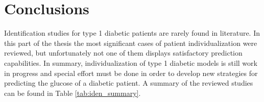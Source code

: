 
\chapter*{Conclusions}
\label{sec:Conclusions}

Identification studies for type 1 diabetic patients are rarely found in literature. In this part of the thesis the most significant cases of patient individualization were reviewed, but unfortunately not one of them displays satisfactory prediction capabilities. In summary, individualization of type 1 diabetic models is still work in progress and special effort must be done in order to develop new strategies for predicting the glucose of a diabetic patient. A summary of the reviewed studies can be found in Table \ref{tab:iden_summary}.

